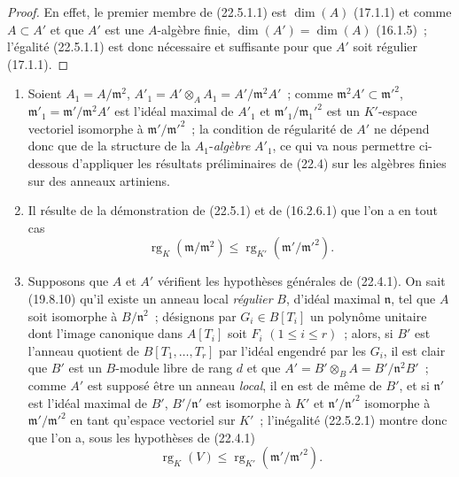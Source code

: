 \begin{proof}
En effet, le premier membre de (22.5.1.1) est $\dim(A)$ (17.1.1) et comme
$A\subset A'$ et que $A'$ est une $A$-algèbre finie,
$\dim(A')=\dim(A)$ (16.1.5)~; l'égalité (22.5.1.1) est donc nécessaire et
suffisante pour que $A'$ soit régulier (17.1.1).
\end{proof}

\begin{remarks}[22.5.2]
\label{0.22.5.2-fr}
\begin{enumerate}
  \item[\rm(i)] Soient $A_1=A/\mathfrak m^2$,
  $A'_1=A'\otimes_AA_1=A'/\mathfrak m^2A'$~; comme
  $\mathfrak m^2A'\subset\mathfrak m'^2$,
  $\mathfrak m'_1=\mathfrak m'/\mathfrak m^2A'$ est l'idéal maximal de $A'_1$
  et $\mathfrak m'_1/\mathfrak m_1'^2$ est un $K'$-espace vectoriel isomorphe
  à $\mathfrak m'/\mathfrak m'^2$~; la condition de régularité de $A'$ ne
  dépend donc que de la structure de la $A_1$-\emph{algèbre} $A'_1$, ce qui va nous
  permettre ci-dessous d'appliquer les résultats préliminaires de (22.4) sur
  les algèbres finies sur des anneaux artiniens.
  \item[\rm(ii)] Il résulte de la démonstration de (22.5.1) et de (16.2.6.1)
  que l'on a en tout cas
  \begin{equation}
  \label{0.22.5.2.1-fr}
    \operatorname{rg}_K(\mathfrak m/\mathfrak m^2)
    \leqslant\operatorname{rg}_{K'}(\mathfrak m'/\mathfrak m'^2).
    \tag{22.5.2.1}
  \end{equation}


  \item[\rm(iii)] Supposons que $A$ et $A'$ vérifient les hypothèses générales
  de (22.4.1). On sait (19.8.10) qu'il existe un anneau local \emph{régulier}
  $B$, d'idéal maximal $\mathfrak n$, tel que $A$ soit isomorphe à
  $B/\mathfrak n^2$~; désignons par $G_i\in B[T_i]$ un polynôme unitaire dont
  l'image canonique dans $A[T_i]$ soit $F_i$ $(1\leqslant i\leqslant r)$~;
  alors, si $B'$ est l'anneau quotient de $B[T_1,\ldots,T_r]$ par l'idéal
  engendré par les $G_i$, il est clair que $B'$ est un $B$-module libre de rang
  $d$ et que $A'=B'\otimes_BA=B'/\mathfrak n^2B'$~; comme $A'$ est supposé être
  un anneau \emph{local}, il en est de même de $B'$, et si $\mathfrak n'$ est l'idéal
  maximal de $B'$, $B'/\mathfrak n'$ est isomorphe à $K'$ et
  $\mathfrak n'/\mathfrak n'^2$ isomorphe à $\mathfrak m'/\mathfrak m'^2$ en
  tant qu'espace vectoriel sur $K'$~; l'inégalité (22.5.2.1) montre donc que
  l'on a, sous les hypothèses de (22.4.1)
  \begin{equation}
  \label{0.22.5.2.2-fr}
    \operatorname{rg}_K(V)\leqslant\operatorname{rg}_{K'}(\mathfrak m'/\mathfrak m'^2).
    \tag{22.5.2.2}
  \end{equation}
\end{enumerate}
\end{remarks}

